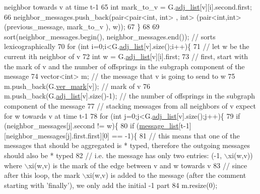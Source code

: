 \begin{DoxyCode}
{       neighbor towards v at time t-1}
65           \textcolor{keywordtype}{int} mark\_to\_v = G.\hyperlink{classmarked__graph_a1a0bf7ca413a278763f7c878b3b6fd6f}{adj\_list}[v][i].second.first;
66           neighbor\_messages.push\_back(pair<pair<int, int> , \textcolor{keywordtype}{int}> (pair<int,int>(previous\_message, mark\_to\_v
      ), w));
67         \}
68 
69         sort(neighbor\_messages.begin(), neighbor\_messages.end()); \textcolor{comment}{// sorts lexicographically }
70         \textcolor{keywordflow}{for} (\textcolor{keywordtype}{int} i=0;i<G.\hyperlink{classmarked__graph_a1a0bf7ca413a278763f7c878b3b6fd6f}{adj\_list}[v].size();i++)\{
71           \textcolor{comment}{// let w be the current ith neighbor of v}
72           \textcolor{keywordtype}{int} w = G.\hyperlink{classmarked__graph_a1a0bf7ca413a278763f7c878b3b6fd6f}{adj\_list}[v][i].first;
73           \textcolor{comment}{// first, start with the mark of v and the number of offsprings in the subgraph component of the
       message}
74           vector<int> m; \textcolor{comment}{// the message that v is going to send to w }
75           m.push\_back(G.\hyperlink{classmarked__graph_ac83e9377dd4d8bb95be1ac949b127296}{ver\_mark}[v]); \textcolor{comment}{// mark of v}
76           m.push\_back(G.\hyperlink{classmarked__graph_a1a0bf7ca413a278763f7c878b3b6fd6f}{adj\_list}[v].size()-1); \textcolor{comment}{// the number of offsprings in the subgraph
       component of the message}
77           \textcolor{comment}{// stacking messages from all neighbors of v expect for w towards v at time t-1}
78           \textcolor{keywordflow}{for} (\textcolor{keywordtype}{int} j=0;j<G.\hyperlink{classmarked__graph_a1a0bf7ca413a278763f7c878b3b6fd6f}{adj\_list}[v].size();j++)\{
79             \textcolor{keywordflow}{if} (neighbor\_messages[j].second != w)\{
80               \textcolor{keywordflow}{if} (\hyperlink{classgraph__message_aa17fdb629b423343edfafa97252763ef}{message\_list}[t-1][neighbor\_messages[j].first.first][0] == -1)\{
81                 \textcolor{comment}{// this means that one of the messages that should be aggregated is * typed, therefore the
       outgoing messages should also be * typed}
82                 \textcolor{comment}{// i.e. the message has only two entries: (-1, \(\backslash\)xi(w,v)) where \(\backslash\)xi(w,v) is the mark of the
       edge between v and w towards v}
83                 \textcolor{comment}{// since after this loop, the mark \(\backslash\)xi(w,v) is added to the message (after the comment
       starting with 'finally'), we only add the initial -1 part}
84                 m.resize(0);

\end{DoxyCode}

